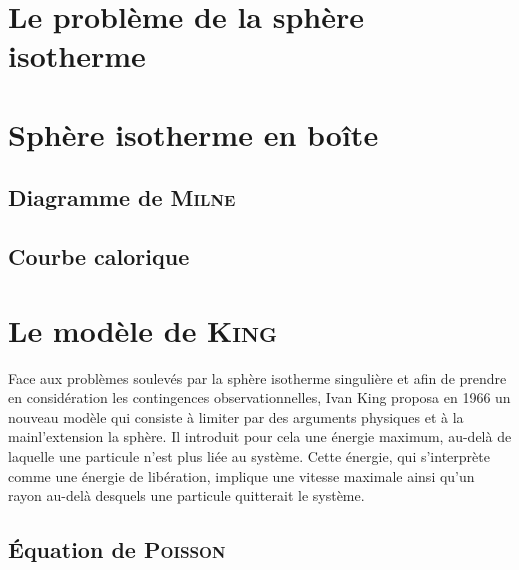 \chapter{Le problème de la sphère isotherme}
		\minitoc
		
		

\chapter{Sphère isotherme en boîte\label{SIB::Chapitre}} %
	\minitoc

	\section{Diagramme de \textsc{Milne}}
		

	\section{Courbe calorique}
		

%			

\chapter{Le modèle de \textsc{King}\label{King::Chapitre}}
	\minitoc
Face aux problèmes soulevés par la sphère isotherme singulière et afin de prendre en considération les contingences observationnelles, Ivan King proposa en 1966 un nouveau modèle
qui consiste à limiter par des arguments physiques et \og à la main\fg l'extension la sphère.
Il introduit pour cela une énergie maximum, au-delà de laquelle une particule n'est plus liée au système.
Cette énergie, qui s'interprète comme une énergie de libération, implique une vitesse maximale ainsi qu'un rayon au-delà desquels une particule quitterait le système.

	\section{Équation de \textsc{Poisson}}
		

